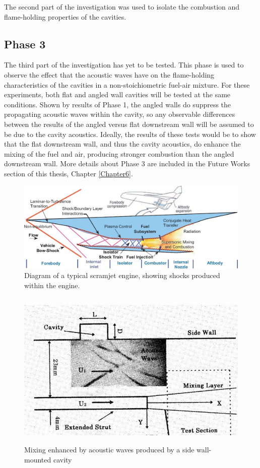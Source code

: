 The second part of the investigation was used to isolate the combustion and flame-holding properties of the cavities.



\subsection{Phase 3}

The third part of the investigation has yet to be tested. This phase is used to observe the effect that the acoustic waves have on the flame-holding characteristics of the cavities in a non-stoichiometric fuel-air mixture. For these experiments, both flat and angled wall cavities will be tested at the same conditions. Shown by results of Phase 1, the angled walls do suppress the propagating acoustic waves within the cavity, so any observable differences between the results of the angled versus flat downstream wall will be assumed to be due to the cavity acoustics. Ideally, the results of these tests would be to show that the flat downstream wall, and thus the cavity acoustics, do enhance the mixing of the fuel and air, producing stronger combustion than the angled downstream wall. More details about Phase 3 are included in the Future Works section of this thesis, Chapter \ref{Chapter6}.


\newpage

\begin{figure}
\centering
\includegraphics[width=\textwidth]{Figures/scramjet.jpg}
\caption[Scramjet Diagram]{Diagram of a typical scramjet engine, showing shocks produced within the engine. \cite{scramjetFig}}
\label{fig:scramjet}
\end{figure}


\begin{figure}
\centering
\includegraphics[height=3in]{Figures/CavMix.jpg}
\caption[Cavity-Actuated Mixing]{Mixing enhanced by acoustic waves produced by a side wall-mounted cavity \cite{sato1999advanced}}
\label{fig:sato}
\end{figure}

